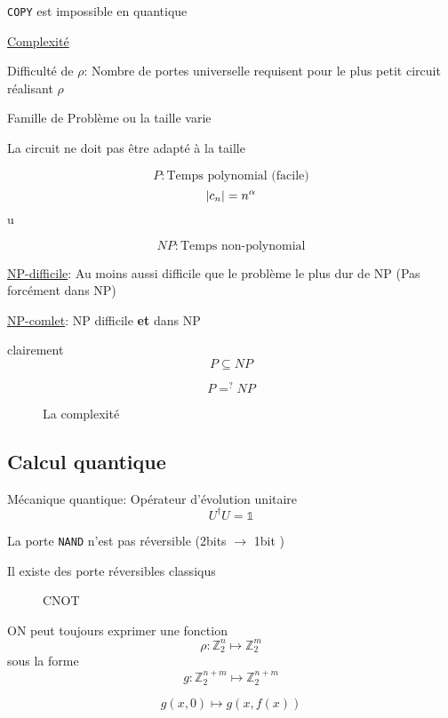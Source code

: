 \begin{tcolorbox}[title=]
	\verb|COPY| est impossible en quantique \centering
	 
\end{tcolorbox}

\underline{Complexité} 


Difficulté de $\rho$: Nombre de portes universelle requisent pour le plus petit circuit réalisant $\rho$  

Famille de Problème ou la taille varie

La circuit ne doit pas être adapté à la taille

\begin{tcolorbox}[title=]
	 $$P: \text{Temps polynomial (facile)} $$ 
	 $$\abs{c_{n}} = n^\alpha $$
u

	 $$NP: \text{Temps non-polynomial} $$ 

	 \underline{NP-difficile}: Au moins aussi difficile que le problème le plus dur de NP (Pas forcément dans NP) 

	 \underline{NP-comlet}: NP difficile \textbf{et} dans NP 
	 
	 clairement $$P \subseteq NP $$ 

	 $$\boxed{\boxed{P =^?NP}}$$ 
\end{tcolorbox}

\begin{figure}[ht]
    \centering
    \caption{La complexité}
    \label{fig:la-complexité}
\end{figure}
\subsection{Calcul quantique}

Mécanique quantique: Opérateur d'évolution unitaire
$$U^{\dagger}U = \mathds{1}$$ 

La porte \verb|NAND| n'est pas réversible (2bits $\to$ 1bit )

Il existe des porte réversibles classiqus

\begin{figure}[ht]
    \centering
    \caption{CNOT}
    \label{fig:cnot}
\end{figure}

\begin{tcolorbox}[title=Note]
	ON peut toujours exprimer une fonction 
	$$\rho: \mathbb{Z}_2^n \mapsto \mathbb{Z}_2^m$$
	sous la forme 
	$$g: \mathbb{Z}^{n+m}_2 \mapsto \mathbb{Z}^{n+m}_2$$  

	$$g(x,0) \mapsto g(x, f(x))$$ 

\end{tcolorbox}

